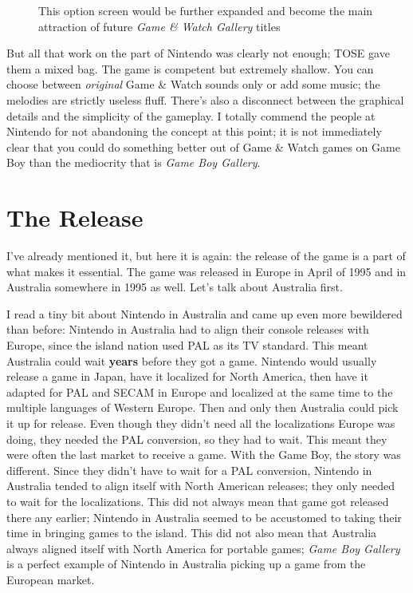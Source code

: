 \documentclass{book}
\begin{document}
\FloatBarrier\vspace{\baselineskip}\begin{figure}[H]\caption*{This option screen would be further expanded and become the main attraction of future \emph{Game \& Watch Gallery} titles}\end{figure}
But all that work on the part of Nintendo was clearly not enough; TOSE gave them a mixed bag. The game is competent but extremely shallow. You can choose between \emph{original} Game \& Watch sounds only or add some music; the melodies are strictly useless fluff. There’s also a disconnect between the graphical details and the simplicity of the gameplay. I totally commend the people at Nintendo for not abandoning the concept at this point; it is not immediately clear that you could do something better out of Game \& Watch games on Game Boy than the mediocrity that is \emph{Game Boy Gallery}.\par
\FloatBarrier\section*{The Release}
I’ve already mentioned it, but here it is again: the release of the game is a part of what makes it essential. The game was released in Europe in April of 1995 and in Australia somewhere in 1995 as well. Let’s talk about Australia first.\par
I read a tiny bit about Nintendo in Australia and came up even more bewildered than before: Nintendo in Australia had to align their console releases with Europe, since the island nation used PAL as its TV standard. This meant Australia could wait \textbf{years} before they got a game. Nintendo would usually release a game in Japan, have it localized for North America, then have it adapted for PAL and SECAM in Europe and localized at the same time to the multiple languages of Western Europe. Then and only then Australia could pick it up for release. Even though they didn’t need all the localizations Europe was doing, they needed the PAL conversion, so they had to wait. This meant they were often the last market to receive a game. With the Game Boy, the story was different. Since they didn’t have to wait for a PAL conversion, Nintendo in Australia tended to align itself with North American releases; they only needed to wait for the localizations. This did not always mean that game got released there any earlier; Nintendo in Australia seemed to be accustomed to taking their time in bringing games to the island. This did not also mean that Australia always aligned itself with North America for portable games; \emph{Game Boy Gallery} is a perfect example of Nintendo in Australia picking up a game from the European market.\par
\end{document}
